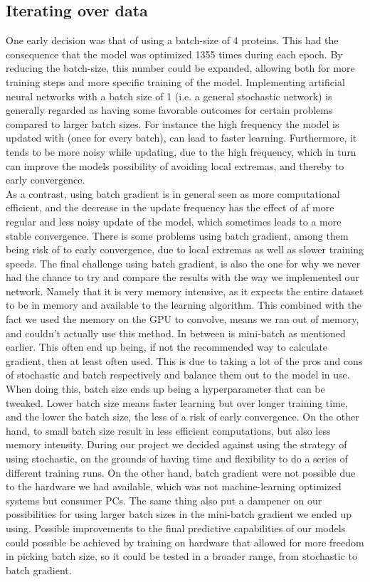 \subsection{Iterating over data}
 One early decision was that of using a batch-size of 4 proteins. This had the consequence that the model was optimized 1355 times during each epoch. By reducing the batch-size, this number could be expanded, allowing both for more training steps and more specific training of the model. Implementing artificial neural networks with a batch size of 1 (i.e. a general stochastic network) is generally regarded as having some favorable outcomes for certain problems compared to larger batch sizes. For instance the high frequency the model is updated with (once for every batch), can lead to faster learning. Furthermore, it tends to be more noisy while updating, due to the high frequency, which in turn can improve the models possibility of avoiding local extremas, and thereby to early convergence.\\ 
  As a contrast, using batch gradient is in general seen as more computational efficient, and the decrease in the update frequency has the effect of af more regular and less noisy update of the model, which sometimes leads to a more stable convergence. There is some problems using batch gradient, among them being risk of to early convergence, due to local extremas as well as slower training speeds. The final challenge using batch gradient, is also the one for why we never had the chance to try and compare the results with the way we implemented our network. Namely that it is very memory intensive, as it expects the entire dataset to be in memory and available to the learning algorithm. This combined with the fact we used the memory on the GPU to convolve, means we ran out of memory, and couldn't actually use this method. In between is mini-batch as mentioned earlier. This often end up being, if not the recommended way to calculate gradient, then at least often used. This is due to taking a lot of the pros and cons of stochastic and batch respectively and balance them out to the model in use. When doing this, batch size ends up being a hyperparameter that can be tweaked. Lower batch size means faster learning but over longer training time, and the lower the batch size, the less of a risk of early convergence. On the other hand, to small batch size result in less efficient computations, but also less memory intensity. During our project we decided against using the strategy of using stochastic, on the grounds of having time and flexibility to do a series of different training runs. On the other hand, batch gradient were not possible due to the hardware we had available, which was not machine-learning optimized systems but consumer PCs. The same thing also put a dampener on our possibilities for using larger batch sizes in the mini-batch gradient we ended up using. Possible improvements to the final predictive capabilities of our models could possible be achieved by training on hardware that allowed for more freedom in picking batch size, so it could be tested in a broader range, from stochastic to batch gradient.\\ 
